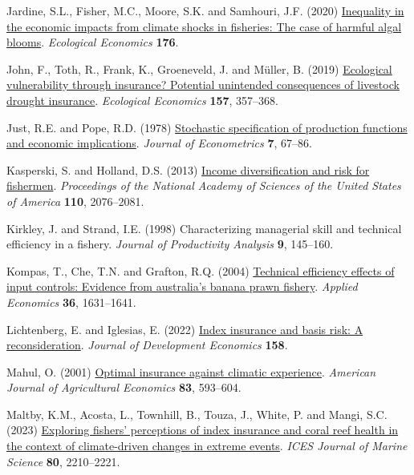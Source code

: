 \documentclass[
  letterpaper,
  DIV=11,
  numbers=noendperiod]{scrartcl}
\newlength{\cslhangindent}
\newlength{\cslentryspacingunit} %
\newenvironment{CSLReferences}[2] %
 {%
  \setlength{\parindent}{0pt}
  \ifodd #1
  \let\oldpar\par
  \def\par{\hangindent=\cslhangindent\oldpar}
  \fi
  \setlength{\parskip}{#2\cslentryspacingunit}
 }%
 {}
\theoremstyle{plain}
\theoremstyle{plain}
\theoremstyle{remark}
\begin{document}
\begin{CSLReferences}{1}{0}
\leavevmode{}%
Jardine, S.L., Fisher, M.C., Moore, S.K. and Samhouri, J.F. (2020)
\href{https://doi.org/10.1016/j.ecolecon.2020.106691}{Inequality in the
economic impacts from climate shocks in fisheries: The case of harmful
algal blooms}. \emph{Ecological Economics} \textbf{176}.

\leavevmode{}%
John, F., Toth, R., Frank, K., Groeneveld, J. and Müller, B. (2019)
\href{https://doi.org/10.1016/J.ECOLECON.2018.11.021}{Ecological
vulnerability through insurance? Potential unintended consequences of
livestock drought insurance}. \emph{Ecological Economics} \textbf{157},
357--368.

\leavevmode{}%
Just, R.E. and Pope, R.D. (1978)
\href{https://doi.org/10.1016/0304-4076(78)90006-4}{Stochastic
specification of production functions and economic implications}.
\emph{Journal of Econometrics} \textbf{7}, 67--86.

\leavevmode{}%
Kasperski, S. and Holland, D.S. (2013)
\href{https://doi.org/10.1073/pnas.1212278110}{Income diversification
and risk for fishermen}. \emph{Proceedings of the National Academy of
Sciences of the United States of America} \textbf{110}, 2076--2081.

\leavevmode{}%
Kirkley, J. and Strand, I.E. (1998) Characterizing managerial skill and
technical efficiency in a fishery. \emph{Journal of Productivity
Analysis} \textbf{9}, 145--160.

\leavevmode{}%
Kompas, T., Che, T.N. and Grafton, R.Q. (2004)
\href{https://doi.org/10.1080/0003684042000218561}{Technical efficiency
effects of input controls: Evidence from australia's banana prawn
fishery}. \emph{Applied Economics} \textbf{36}, 1631--1641.

\leavevmode{}%
Lichtenberg, E. and Iglesias, E. (2022)
\href{https://doi.org/10.1016/j.jdeveco.2022.102883}{Index insurance and
basis risk: A reconsideration}. \emph{Journal of Development Economics}
\textbf{158}.

\leavevmode{}%
Mahul, O. (2001) \href{https://doi.org/10.1111/0002-9092.00180}{Optimal
insurance against climatic experience}. \emph{American Journal of
Agricultural Economics} \textbf{83}, 593--604.

\leavevmode{}%
Maltby, K.M., Acosta, L., Townhill, B., Touza, J., White, P. and Mangi,
S.C. (2023) \href{https://doi.org/10.1093/icesjms/fsac003}{Exploring
fishers' perceptions of index insurance and coral reef health in the
context of climate-driven changes in extreme events}. \emph{ICES Journal
of Marine Science} \textbf{80}, 2210--2221.


\end{CSLReferences}
\end{document}
